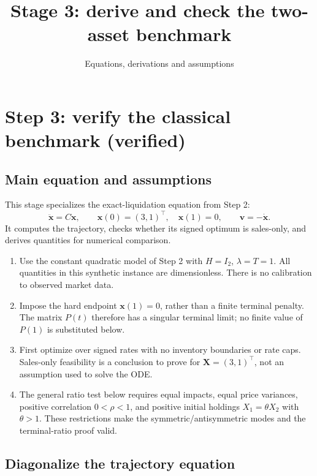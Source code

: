 \documentclass[11pt,a4paper]{article}
\title{Stage 3: derive and check the two-asset benchmark}
\author{Equations, derivations and assumptions}
\date{}
\begin{document}
\maketitle
\setcounter{section}{2}
\section{Step 3: verify the classical benchmark (verified)}
\label{sec:stage3}

\subsection*{Main equation and assumptions}

This stage specializes the exact-liquidation equation from Step 2:
\[
 \boxed{\ddot{\mathbf x}=C\mathbf x,\qquad
 \mathbf x(0)=(3,1)^\top,\quad\mathbf x(1)=0,\qquad
 \mathbf v=-\dot{\mathbf x}.}
\]
It computes the trajectory, checks whether its signed optimum is
sales-only, and derives quantities for numerical comparison.

\begin{enumerate}
\item Use the constant quadratic model of Step 2 with $H=I_2$,
$\lambda=T=1$. All quantities in this synthetic instance are
dimensionless. There is no calibration to observed market data.
\item Impose the hard endpoint $\mathbf x(1)=0$, rather than a finite
terminal penalty. The matrix $P(t)$ therefore has a singular terminal
limit; no finite value of $P(1)$ is substituted below.
\item First optimize over signed rates with no inventory boundaries or
rate caps. Sales-only feasibility is a conclusion to prove for
$\mathbf X=(3,1)^\top$, not an assumption used to solve the ODE.
\item The general ratio test below requires equal impacts, equal price
variances, positive correlation $0<\rho<1$, and positive initial holdings
$X_1=\theta X_2$ with $\theta>1$. These restrictions make the
symmetric/antisymmetric modes and the terminal-ratio proof valid.
\end{enumerate}

\subsection*{Diagonalize the trajectory equation}
\end{document}
